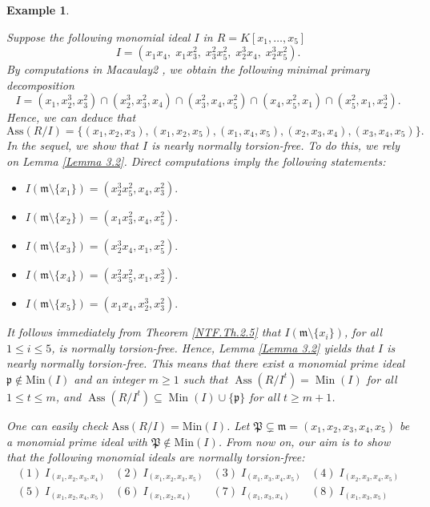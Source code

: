\documentclass[11pt]{amsart}
\newtheorem{example}[theorem]{Example}
\begin{document}
 \begin{example} \label{APP.2}
 \em{ 
Suppose the following monomial ideal $I$ in $R=K[x_1, \ldots, x_5]$ 
\[
I=(x_1x_4,\;x_1x_3^2,\;x_3^2x_5^2,\;x_2^3x_4,\;x_2^3x_5^2). 
\]
By computations in  Macaulay2 \cite{GS},  we obtain the following minimal primary decomposition
$$I=(x_1,x_2^3,x_3^2)\cap (x_2^3,x_3^2,x_4)\cap (x_3^2,x_4,x_5^2)  \cap (x_4,x_5^2,x_1)\cap (x_5^2,x_1,x_2^3).$$
Hence, we can deduce that 
$$\mathrm{Ass}(R/I)=\{(x_1,x_2,x_3),(x_1,x_2,x_5),(x_1,x_4,x_5),(x_2,x_3,x_4),(x_3,x_4,x_5)\}.$$
In the sequel, we  show that $I$ is nearly normally torsion-free. To do this, we rely on Lemma \ref{Lemma 3.2}. Direct computations imply the following 
statements:
\begin{itemize}
\item[$\bullet$] $I(\mathfrak{m}\setminus \{x_1\})=(x_2^3x_5^2, x_4, x_3^2).$
\item[$\bullet$] $I(\mathfrak{m}\setminus \{x_2\})=(x_1x_3^2, x_4, x_5^2).$
\item[$\bullet$] $I(\mathfrak{m}\setminus \{x_3\})=(x_2^3x_4, x_1, x_5^2).$
\item[$\bullet$] $I(\mathfrak{m}\setminus \{x_4\})=(x_3^2x_5^2, x_1, x_2^3).$
\item[$\bullet$] $I(\mathfrak{m}\setminus \{x_5\})=(x_1x_4, x_2^3, x_3^2).$
\end{itemize}
It follows immediately from Theorem \ref{NTF.Th.2.5} that $I(\mathfrak{m}\setminus \{x_i\})$, for all $1\leq i \leq 5$, is normally torsion-free. 
Hence, Lemma \ref{Lemma 3.2} yields that $I$ is nearly normally torsion-free.  This means that there exist  a monomial prime ideal $\mathfrak{p}\notin \mathrm{Min}(I)$ and an integer $m \ge 1$ such that $\operatorname{Ass}(R/I^t) = \operatorname{Min}(I)$ for all $1 \le t \le m$, and 
  $\operatorname{Ass}(R/I^t) \subseteq \operatorname{Min}(I) \cup \{\mathfrak{p}\}$ for all $t \ge m+1$.
  
One can easily check
 $\mathrm{Ass}(R/I)=\mathrm{Min}(I)$.  Let $\mathfrak{P} \subsetneq \mathfrak{m}=(x_1,x_2,x_3,x_4,x_5)$ be a  monomial prime ideal with $\mathfrak{P}\notin \mathrm{Min}(I)$.  From now on, our aim is to show that the following monomial ideals are normally torsion-free:    
\[
\begin{array}{cccc}
(1)\; I_{(x_1,x_2,x_3,x_4)} &
(2)\; I_{(x_1,x_2,x_3,x_5)} &
(3)\; I_{(x_1,x_3,x_4,x_5)} &
(4)\; I_{(x_2,x_3,x_4,x_5)} \\[2mm]

(5)\; I_{(x_1,x_2,x_4,x_5)} &
(6)\; I_{(x_1,x_2,x_4)} &
(7)\; I_{(x_1,x_3,x_4)} &
(8)\; I_{(x_1,x_3,x_5)} \\[2mm]


\end{array}\]}
\end{example}
\end{document}
